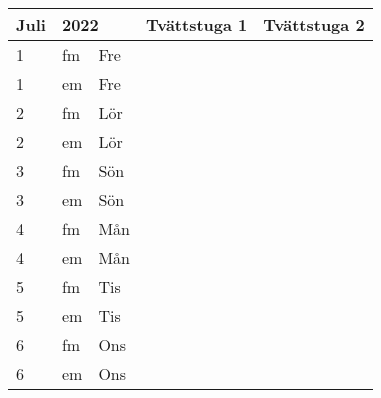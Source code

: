 \documentclass[a4paper]{article}
\begin{document}
\begin{table}[ht!]
\vspace{-10em}%
\normalsize
\begin{tabular}{lllp{7cm}p{7cm}}
\textbf{Juli}           & \multicolumn{2}{l}{\textbf{2022}}                  & \textbf{Tvättstuga 1} & \textbf{Tvättstuga 2} \\ \hline    

\multicolumn{1}{|l|}{1} & \multicolumn{1}{l|}{fm} & \multicolumn{1}{l|}{Fre} & \multicolumn{1}{l|}{} & \multicolumn{1}{l|}{} \\ \hline
\multicolumn{1}{|l|}{1} & \multicolumn{1}{l|}{em} & \multicolumn{1}{l|}{Fre} & \multicolumn{1}{l|}{} & \multicolumn{1}{l|}{} \\ \hline    

\multicolumn{1}{|l|}{2} & \multicolumn{1}{l|}{fm} & \multicolumn{1}{l|}{Lör} & \multicolumn{1}{l|}{} & \multicolumn{1}{l|}{} \\ \hline
\multicolumn{1}{|l|}{2} & \multicolumn{1}{l|}{em} & \multicolumn{1}{l|}{Lör} & \multicolumn{1}{l|}{} & \multicolumn{1}{l|}{} \\ \hline    

\multicolumn{1}{|l|}{3} & \multicolumn{1}{l|}{fm} & \multicolumn{1}{l|}{Sön} & \multicolumn{1}{l|}{} & \multicolumn{1}{l|}{} \\ \hline
\multicolumn{1}{|l|}{3} & \multicolumn{1}{l|}{em} & \multicolumn{1}{l|}{Sön} & \multicolumn{1}{l|}{} & \multicolumn{1}{l|}{} \\ \hline    

\multicolumn{1}{|l|}{4} & \multicolumn{1}{l|}{fm} & \multicolumn{1}{l|}{Mån} & \multicolumn{1}{l|}{} & \multicolumn{1}{l|}{} \\ \hline
\multicolumn{1}{|l|}{4} & \multicolumn{1}{l|}{em} & \multicolumn{1}{l|}{Mån} & \multicolumn{1}{l|}{} & \multicolumn{1}{l|}{} \\ \hline    

\multicolumn{1}{|l|}{5} & \multicolumn{1}{l|}{fm} & \multicolumn{1}{l|}{Tis} & \multicolumn{1}{l|}{} & \multicolumn{1}{l|}{} \\ \hline
\multicolumn{1}{|l|}{5} & \multicolumn{1}{l|}{em} & \multicolumn{1}{l|}{Tis} & \multicolumn{1}{l|}{} & \multicolumn{1}{l|}{} \\ \hline    

\multicolumn{1}{|l|}{6} & \multicolumn{1}{l|}{fm} & \multicolumn{1}{l|}{Ons} & \multicolumn{1}{l|}{} & \multicolumn{1}{l|}{} \\ \hline
\multicolumn{1}{|l|}{6} & \multicolumn{1}{l|}{em} & \multicolumn{1}{l|}{Ons} & \multicolumn{1}{l|}{} & \multicolumn{1}{l|}{} \\ \hline    


\end{tabular}
\end{table}
\end{document}
